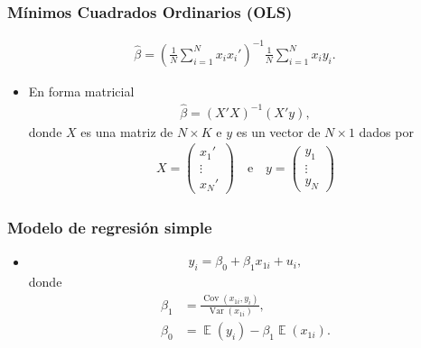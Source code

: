 \documentclass[t, compress, spanish, aspectratio=169]{beamer}
\DeclareMathOperator{\Var}{Var}
\DeclareMathOperator{\Cov}{Cov}
\DeclareMathOperator{\E}{\mathbb{E}}
\begin{document}
	\begin{frame}
		\frametitle{M\'inimos Cuadrados Ordinarios (OLS)}
		\begin{align*}
			\hat \beta =\left(\frac{1}{N}\sum_{i=1}^{N} x_ix_i'\right)^{-1} \frac{1}{N} \sum_{i=1}^{N}x_iy_i.
		\end{align*}
		\begin{itemize}
			\item En forma matricial
			\begin{align*}
				\hat \beta =(X'X)^{-1}(X'y),
			\end{align*}
			donde $X$ es una matriz de $N \times K$ e $y$ es un vector de $N \times 1$ dados por
			\begin{align*}
				X =\left(
				\begin{array} {c}
					x_1'   \\
					\vdots \\
					x_N'
				\end{array}
				\right)
				\quad \text{e} \quad
				y =\left(
				\begin{array} {c}
					y_1   \\
					\vdots \\
					y_N
				\end{array}
				\right)
			\end{align*}
		\end{itemize}
	\end{frame}
	\begin{frame}
		\frametitle{Modelo de regresi\'on simple}
		\begin{itemize}
			\item []
			\begin{align*}
				y_i = \beta_0 + \beta_1 x_{1i}+u_i,
			\end{align*}
			donde
			\begin{align*}
				\beta_1 &= \frac{\Cov(x_{1i}, y_i)}{\Var(x_{1i})},\\
				\beta_0 &= \E(y_i)-\beta_1\E(x_{1i}).
			\end{align*}
		\end{itemize}
	\end{frame}
%	
%	
	
\end{document}

